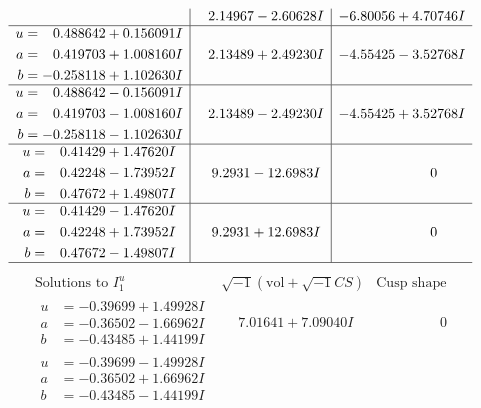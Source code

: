 \documentclass[1p]{elsarticle_modified}
\theoremstyle{definition}
\newcommand{\I}{\sqrt{-1}}
\begin{document}
$$\begin{array}{c|c|c}
 & \phantom{-}2.14967 - 2.60628 I & -6.80056 + 4.70746 I \\ \hline\begin{aligned}
u &= \phantom{-}0.488642 + 0.156091 I \\
a &= \phantom{-}0.419703 + 1.008160 I \\
b &= -0.258118 + 1.102630 I\end{aligned}
 & \phantom{-}2.13489 + 2.49230 I & -4.55425 - 3.52768 I \\ \hline\begin{aligned}
u &= \phantom{-}0.488642 - 0.156091 I \\
a &= \phantom{-}0.419703 - 1.008160 I \\
b &= -0.258118 - 1.102630 I\end{aligned}
 & \phantom{-}2.13489 - 2.49230 I & -4.55425 + 3.52768 I \\ \hline\begin{aligned}
u &= \phantom{-}0.41429 + 1.47620 I \\
a &= \phantom{-}0.42248 - 1.73952 I \\
b &= \phantom{-}0.47672 + 1.49807 I\end{aligned}
 & \phantom{-}9.2931 - 12.6983 I & \phantom{-0.000000 } 0 \\ \hline\begin{aligned}
u &= \phantom{-}0.41429 - 1.47620 I \\
a &= \phantom{-}0.42248 + 1.73952 I \\
b &= \phantom{-}0.47672 - 1.49807 I\end{aligned}
 & \phantom{-}9.2931 + 12.6983 I & \phantom{-0.000000 } 0\\
 \hline 
 \end{array}$$\newpage$$\begin{array}{c|c|c}  
\text{Solutions to }I^u_{1}& \I (\text{vol} + \sqrt{-1}CS) & \text{Cusp shape}\\
 \hline 
\begin{aligned}
u &= -0.39699 + 1.49928 I \\
a &= -0.36502 - 1.66962 I \\
b &= -0.43485 + 1.44199 I\end{aligned}
 & \phantom{-}7.01641 + 7.09040 I & \phantom{-0.000000 } 0 \\ \hline\begin{aligned}
u &= -0.39699 - 1.49928 I \\
a &= -0.36502 + 1.66962 I \\
b &= -0.43485 - 1.44199 I\end{aligned}

\end{array}$$
\end{document}
